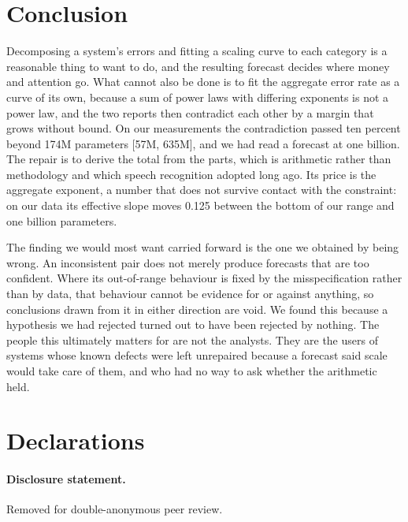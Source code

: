 \documentclass[11pt]{article}
\begin{document}
\section{Conclusion}
\label{sec:conclusion}

Decomposing a system's errors and fitting a scaling curve to each category is a
reasonable thing to want to do, and the resulting forecast decides where money and
attention go. What cannot also be done is to fit the aggregate error rate as a curve
of its own, because a sum of power laws with differing exponents is not a power law,
and the two reports then contradict each other by a margin that grows without bound.
On our measurements the contradiction passed ten percent beyond
174M parameters [57M, 635M],
and we had read a forecast at one billion. The repair is to derive the total from
the parts, which is arithmetic rather than methodology and which speech recognition
adopted long ago. Its price is the aggregate exponent, a number that does not
survive contact with the constraint: on our data its effective slope moves
0.125 between the bottom of our range and one billion parameters.

The finding we would most want carried forward is the one we obtained by being
wrong. An inconsistent pair does not merely produce forecasts that are too
confident. Where its out-of-range behaviour is fixed by the misspecification rather
than by data, that behaviour cannot be evidence for or against anything, so
conclusions drawn from it in either direction are void. We found this because a
hypothesis we had rejected turned out to have been rejected by nothing. The people this ultimately matters for are not the analysts.
They are the users of systems whose known defects were left unrepaired because a
forecast said scale would take care of them, and who had no way to ask whether the
arithmetic held.

\section*{Declarations}

\paragraph{Disclosure statement.}

Removed for double-anonymous peer review.
\end{document}
